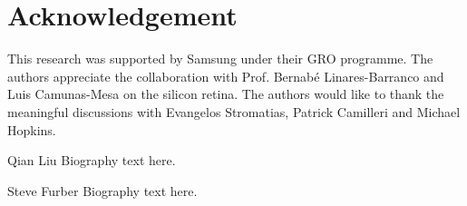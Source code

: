\documentclass[journal]{journal}
\begin{document}
\section{Acknowledgement}
This research was supported by Samsung under their GRO programme.
The authors appreciate the collaboration with Prof. Bernab{\'e} Linares-Barranco and Luis Camunas-Mesa on the silicon retina.
The authors would like to thank the meaningful discussions with Evangelos Stromatias, Patrick Camilleri and Michael Hopkins.


\begin{IEEEbiography}{Qian Liu}
Biography text here.
\end{IEEEbiography}
\begin{IEEEbiography}{Steve Furber}
Biography text here.
\end{IEEEbiography}
\end{document}

